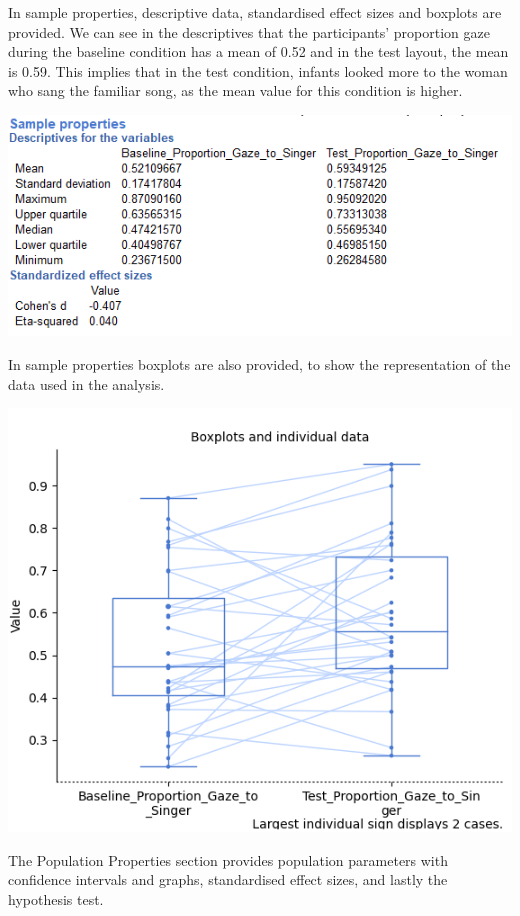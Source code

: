 \documentclass[
]{book}
\begin{document}
In sample properties, descriptive data, standardised effect sizes and boxplots are provided. We can see in the descriptives that the participants' proportion gaze during the baseline condition has a mean of 0.52 and in the test layout, the mean is 0.59. This implies that in the test condition, infants looked more to the woman who sang the familiar song, as the mean value for this condition is higher.

\includegraphics{img/ch6/6.7comparerepeatedmeasures_sampleprop.png}

In sample properties boxplots are also provided, to show the representation of the data used in the analysis.

\includegraphics{img/ch6/6.7comparerepeatedmeasures_boxplot.png}

The Population Properties section provides population parameters with confidence intervals and graphs, standardised effect sizes, and lastly the hypothesis test.
\end{document}
